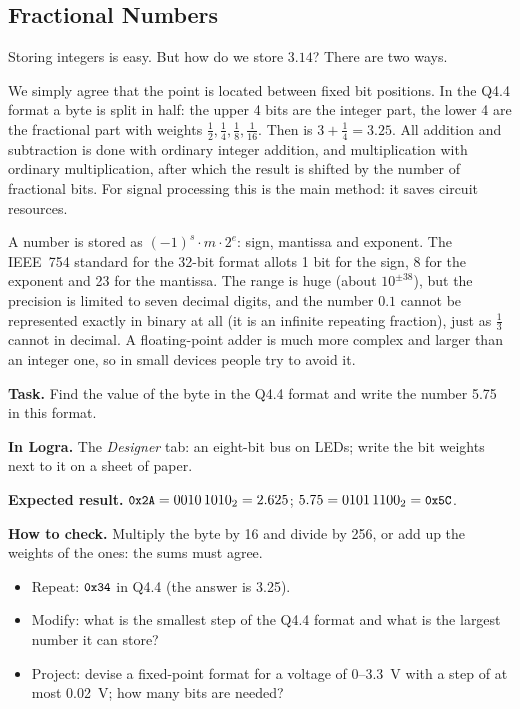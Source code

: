 \subsection{Fractional Numbers}

Storing integers is easy. But how do we store $3.14$? There are two ways.

 We simply agree that the point is located
between fixed bit positions. In the Q4.4 format a byte is split in half: the upper
4 bits are the integer part, the lower 4 are the fractional part with weights $\tfrac12, \tfrac14,
\tfrac18, \tfrac1{16}$. Then  is $3 + \tfrac14 = 3.25$. All
addition and subtraction is done with ordinary integer addition, and
multiplication with ordinary multiplication, after which the result is shifted by
the number of fractional bits. For signal processing this is the main method: it
saves circuit resources.

 A number is stored as $(-1)^s \cdot m \cdot
2^{e}$: sign, mantissa and exponent. The IEEE~754 standard for the 32-bit
 format allots 1 bit for the sign, 8 for the exponent and 23 for the mantissa.
The range is huge (about $10^{\pm 38}$), but the precision is limited to seven decimal
digits, and the number $0.1$ cannot be represented exactly in binary at all (it is
an infinite repeating fraction), just as $\tfrac13$ cannot in decimal. A
floating-point adder is much more complex and larger than an integer one,
so in small devices people try to avoid it.

\begin{diybox}
\textbf{Task.} Find the value of the byte  in the Q4.4 format and
write the number 5.75 in this format.\par
\textbf{In Logra.} The \emph{Designer} tab: an eight-bit bus on
LEDs; write the bit weights next to it on a sheet of paper.\par
\textbf{Expected result.} $\texttt{\small 0x2A}=0010\,1010_2=2.625$;
$5.75=0101\,1100_2=\texttt{\small 0x5C}$.\par
\textbf{How to check.} Multiply the byte by 16 and divide by 256, or
add up the weights of the ones: the sums must agree.
\begin{itemize}[leftmargin=3.4em,labelwidth=3em,labelsep=0.4em,align=left]
  \item[\stars{1}] Repeat: $\texttt{\small 0x34}$ in Q4.4 (the answer is 3.25).
  \item[\stars{2}] Modify: what is the smallest step of the Q4.4 format and what is the largest
    number it can store?
  \item[\stars{3}] Project: devise a fixed-point format for a voltage
    of 0--3.3~V with a step of at most 0.02~V; how many bits are needed?
\end{itemize}
\end{diybox}

